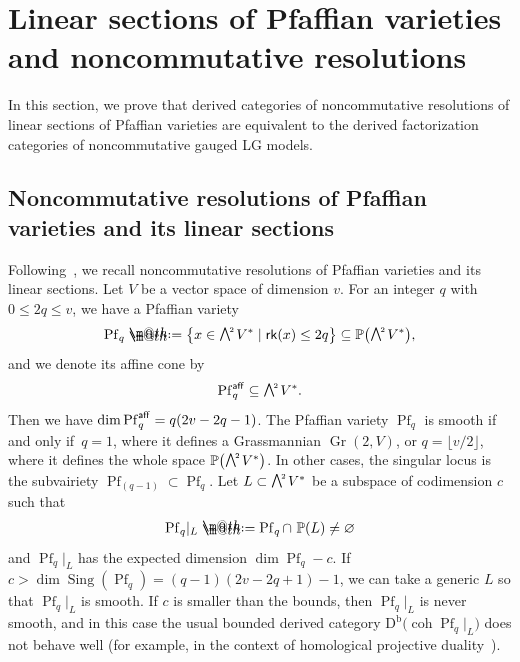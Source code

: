 \documentclass[10pt,a4paper]{amsart}
\makeatletter
\newcommand*{\defeq}{\mathrel{\rlap{%
 \raisebox{0.3ex}{$\m@th\cdot$}}%
 \raisebox{-0.3ex}{$\m@th\cdot$}}%
 =}
\numberwithin{equation}{section}
\newcommand{\Sing}{\operatorname{Sing}}
\newcommand{\coh}{\operatorname{coh}}
\newcommand{\Db}{\operatorname{D^b}}
\newcommand{\Pf}{\operatorname{Pf}}
\newcommand{\Gr}{\operatorname{Gr}}
\newcommand{\aff}{\operatorname{\sf aff}}
\newcommand{\rk}{\operatorname{\sf rk}}
\newcommand{\bP}{\mathbb{P}}
\newcommand{\gwedge}{\raisebox{1pt}[0pt][0pt]{$\textstyle \bigwedge^{\raisebox{-1pt}[0pt][0pt]{\tiny\!$2$\,}}$}}
\newcommand{\rest}{\!|_L}
\makeatother
\begin{document}










\section[Linear sections of Pfaffian varieties and noncommutative resolutions]
{Linear sections of Pfaffian varieties\\ and noncommutative resolutions}

In this section, we prove that derived categories of noncommutative resolutions of linear sections of Pfaffian varieties are equivalent to the derived factorization categories of noncommutative gauged LG models.

\subsection{Noncommutative resolutions of Pfaffian varieties and its linear sections} Following~\cite{rs}, we recall noncommutative resolutions of Pfaffian varieties and its linear sections.
Let $V$ be a vector space of dimension $v$. For an integer $q$ with $0\leq 2q\leq v$, we have a Pfaffian variety
\begin{gather*}
\Pf_q\defeq\big\{x\in\gwedge V^* \mid \rk(x)\leq 2q\big\}\subseteq \bP\big(\gwedge V^*\big),
\end{gather*}
and we denote its affine cone by
\begin{gather*}
\Pf_q^{\aff}\subseteq \gwedge V^*.
\end{gather*}
Then we have $\dim \Pf_q^{\aff}=q(2v-2q-1)$.
The Pfaffian variety $\Pf_q$ is smooth if and only if~$q=1$, where it defines a Grassmannian $\Gr(2,V)$, or $q=\lfloor v/2\rfloor$, where it defines the whole space $\bP\big(\gwedge V^*\big)$. In other cases, the singular locus is the subvairiety $\Pf_{(q-1)}\subset \Pf_q$. Let $L\subset \gwedge V^*$ be a subspace of codimension $c$ such that
\begin{gather*}
\Pf_q\rest\defeq\Pf_q\cap\,\,\bP(L)\neq\varnothing
\end{gather*}
and $\Pf_q\rest$ has the expected dimension $\dim\Pf_q-c$. If $c>\dim \Sing(\Pf_q)=(q-1)(2v-2q+1)-1$, we can take a generic $L$ so that $\Pf_q\rest$ is smooth. If $c$ is smaller than the bounds, then $\Pf_q\rest$ is never smooth, and in this case the usual bounded derived category $\Db\big(\coh \Pf_q\rest\big)$ does not behave well (for example, in the context of homological projective duality~\cite{rs}). %
\end{document}
